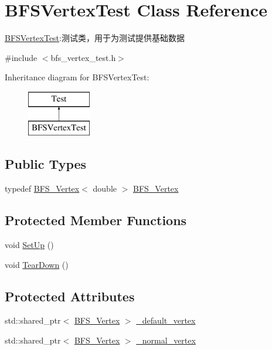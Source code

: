 \hypertarget{class_b_f_s_vertex_test}{}\section{B\+F\+S\+Vertex\+Test Class Reference}
\label{class_b_f_s_vertex_test}


\hyperlink{class_b_f_s_vertex_test}{B\+F\+S\+Vertex\+Test}\+:测试类，用于为测试提供基础数据  




{\ttfamily \#include $<$bfs\+\_\+vertex\+\_\+test.\+h$>$}

Inheritance diagram for B\+F\+S\+Vertex\+Test\+:\begin{figure}[H]
\begin{center}
\leavevmode
\includegraphics[height=2.000000cm]{class_b_f_s_vertex_test}
\end{center}
\end{figure}
\subsection*{Public Types}
\begin{DoxyCompactItemize}
\item 
typedef \hyperlink{class_b_f_s_vertex_test_a9ff4e5b50fe6468b08ee5e04f0527d7c}{B\+F\+S\+\_\+\+Vertex}$<$ double $>$ \hyperlink{class_b_f_s_vertex_test_a9ff4e5b50fe6468b08ee5e04f0527d7c}{B\+F\+S\+\_\+\+Vertex}
\end{DoxyCompactItemize}
\subsection*{Protected Member Functions}
\begin{DoxyCompactItemize}
\item 
void \hyperlink{class_b_f_s_vertex_test_a3f6d438f93bb897fc216d30a49718ce3}{Set\+Up} ()
\item 
void \hyperlink{class_b_f_s_vertex_test_a199a64fd9255e1f6908bb37da0fce740}{Tear\+Down} ()
\end{DoxyCompactItemize}
\subsection*{Protected Attributes}
\begin{DoxyCompactItemize}
\item 
std\+::shared\+\_\+ptr$<$ \hyperlink{class_b_f_s_vertex_test_a9ff4e5b50fe6468b08ee5e04f0527d7c}{B\+F\+S\+\_\+\+Vertex} $>$ \hyperlink{class_b_f_s_vertex_test_ab78f6c9cb070fe5a8992f61cc5f71920}{\+\_\+default\+\_\+vertex}
\item 
std\+::shared\+\_\+ptr$<$ \hyperlink{class_b_f_s_vertex_test_a9ff4e5b50fe6468b08ee5e04f0527d7c}{B\+F\+S\+\_\+\+Vertex} $>$ \hyperlink{class_b_f_s_vertex_test_aedd37204d4a3723bd78fa72af7caa6e0}{\+\_\+normal\+\_\+vertex}
\end{DoxyCompactItemize}


